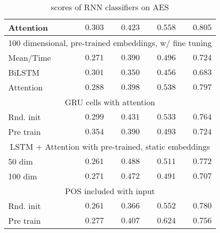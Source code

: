 \begin{table}
\begin{tabular}{lrrrr}
    Attention &         $0.303$  &         $0.423$  &         $0.558$  & $\mathbf{0.805}$ \\
    \midrule
              \multicolumn{5}{c}{100 dimensional, pre-trained embeddings, w/ fine tuning} \\
    \midrule
    Mean/Time &         $0.271$  &         $0.390$  &         $0.496$  &         $0.724$  \\
    BiLSTM    &         $0.301$  &         $0.350$  &         $0.456$  &         $0.683$  \\
    Attention &         $0.288$  &         $0.398$  &         $0.538$  &         $0.797$  \\
    \midrule
              \multicolumn{5}{c}{GRU cells with attention} \\
    \midrule
    Rnd. init &         $0.299$  &         $0.431$  &         $0.533$  &         $0.764$  \\
    Pre train & $\mathbf{0.354}$ &         $0.390$  &         $0.493$  &         $0.724$  \\
    \midrule
              \multicolumn{5}{c}{LSTM + Attention with pre-trained, static embeddings} \\
    \midrule
    50 dim    &         $0.261$  & $\mathbf{0.488}$ &         $0.511$  &         $0.772$  \\
    100 dim   &         $0.271$  &         $0.472$  &         $0.491$  &         $0.707$  \\
    \midrule
              \multicolumn{5}{c}{POS included with input} \\
    \midrule
    Rnd. init &         $0.261$  &         $0.366$  &         $0.552$  &         $0.780$  \\
    Pre train &         $0.277$  &         $0.407$  & $\mathbf{0.624}$ &         $0.756$  \\
    \bottomrule
  \end{tabular}
  \caption{\FI scores of RNN classifiers on AES}
  \label{tab:rnn-results}
\end{table}

